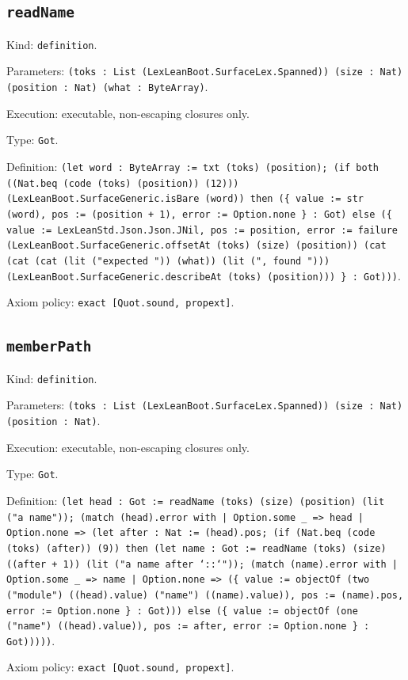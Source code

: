\documentclass[11pt]{article}
\begin{document}
\subsection*{\texttt{readName}}
\noindent Kind: \texttt{definition}.\par
\noindent Parameters: \texttt{(toks : List (LexLeanBoot.SurfaceLex.Spanned)) (size : Nat) (position : Nat) (what : ByteArray)}.\par
\noindent Execution: executable, non-escaping closures only.\par
\noindent Type: \texttt{Got}.\par
\noindent Definition: \texttt{(let word : ByteArray := txt (toks) (position); (if both ((Nat.beq (code (toks) (position)) (12))) (LexLeanBoot.SurfaceGeneric.isBare (word)) then (\{ value := str (word), pos := (position + 1), error := Option.none \} : Got) else (\{ value := LexLeanStd.Json.Json.JNil, pos := position, error := failure (LexLeanBoot.SurfaceGeneric.offsetAt (toks) (size) (position)) (cat (cat (cat (lit ("expected ")) (what)) (lit (", found "))) (LexLeanBoot.SurfaceGeneric.describeAt (toks) (position))) \} : Got)))}.\par
\noindent Axiom policy: \texttt{exact [Quot.sound, propext]}.\par
\subsection*{\texttt{memberPath}}
\noindent Kind: \texttt{definition}.\par
\noindent Parameters: \texttt{(toks : List (LexLeanBoot.SurfaceLex.Spanned)) (size : Nat) (position : Nat)}.\par
\noindent Execution: executable, non-escaping closures only.\par
\noindent Type: \texttt{Got}.\par
\noindent Definition: \texttt{(let head : Got := readName (toks) (size) (position) (lit ("a name")); (match (head).error with | Option.some \_ => head | Option.none => (let after : Nat := (head).pos; (if (Nat.beq (code (toks) (after)) (9)) then (let name : Got := readName (toks) (size) ((after + 1)) (lit ("a name after `::`")); (match (name).error with | Option.some \_ => name | Option.none => (\{ value := objectOf (two ("module") ((head).value) ("name") ((name).value)), pos := (name).pos, error := Option.none \} : Got))) else (\{ value := objectOf (one ("name") ((head).value)), pos := after, error := Option.none \} : Got)))))}.\par
\noindent Axiom policy: \texttt{exact [Quot.sound, propext]}.\par
\end{document}
